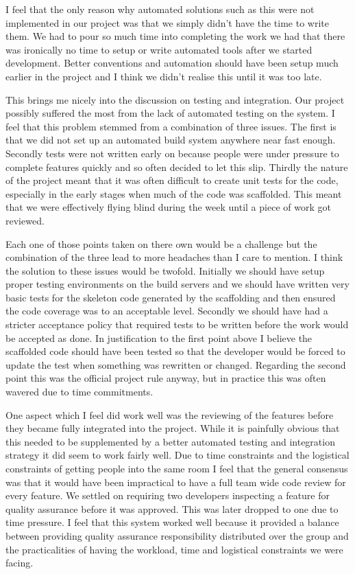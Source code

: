 \documentclass[paper=a4, fontsize=11pt]{scrartcl}	%
\numberwithin{equation}{section}															%
\numberwithin{figure}{section}																%
\numberwithin{table}{section}
\begin{document}
I feel that the only reason why automated solutions such as this were not implemented in our project was that we simply didn't have the time to write them. We had to pour so much time into completing the work we had that there was ironically no time to setup or write automated tools after we started development. Better conventions and automation should have been setup much earlier in the project and I think we didn't realise this until it was too late.

This brings me nicely into the discussion on testing and integration. Our project possibly suffered the most from the lack of automated testing on the system. I feel that this problem stemmed from a combination of three issues. The first is that we did not set up an automated build system anywhere near fast enough. Secondly tests were not written early on because people were under pressure to complete features quickly and so often decided to let this slip. Thirdly the nature of the project meant that it was often difficult to create unit tests for the code, especially in the early stages when much of the code was scaffolded. This meant that we were effectively flying blind during the week until a piece of work got reviewed.

Each one of those points taken on there own would be a challenge but the combination of the three lead to more headaches than I care to mention. I think the solution to these issues would be twofold. Initially we should have setup proper testing environments on the build servers and we should have written very basic tests for the skeleton code generated by the scaffolding and then ensured the code coverage was to an acceptable level. Secondly we should have had a stricter acceptance policy that required tests to be written before the work would be accepted as done. In justification to the first point above I believe the scaffolded code should have been tested so that the developer would be forced to update the test when something was rewritten or changed. Regarding the second point this was the official project rule anyway, but in practice this was often wavered due to time commitments.

One aspect which I feel did work well was the reviewing of the features before they became fully integrated into the project. While it is painfully obvious that this needed to be supplemented by a better automated testing and integration strategy it did seem to work fairly well. Due to time constraints and the logistical constraints of getting people into the same room I feel that the general consensus was that it would have been impractical to have a full team wide code review for every feature. We settled on requiring two developers inspecting a feature for quality assurance before it was approved. This was later dropped to one due to time pressure. I feel that this system worked well because it provided a balance between providing quality assurance responsibility distributed over the group and the practicalities of having the workload, time and logistical constraints we were facing. 
\end{document}
